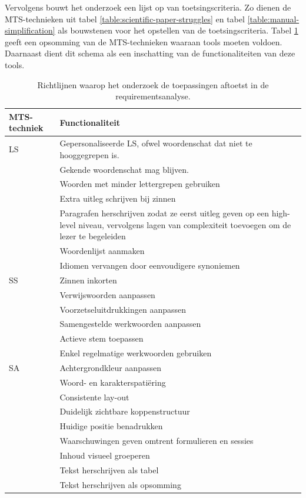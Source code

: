 Vervolgens bouwt het onderzoek een lijst op van toetsingscriteria. Zo dienen de MTS-technieken uit tabel \ref{table:scientific-paper-struggles} en tabel \ref{table:manual-simplification} als bouwstenen voor het opstellen van de toetsingscriteria. Tabel \ref{table:criteria-requirementsanalysis} geeft een opsomming van de MTS-technieken waaraan tools moeten voldoen. Daarnaast dient dit schema als een inschatting van de functionaliteiten van deze tools.

\begin{center}
	\begin{table}[H]
		\begin{tabular}{ | m{4cm} | m{11cm} | } 
			\hline
			\textbf{MTS-techniek} & \textbf{Functionaliteit} \\
			\hline
			LS & Gepersonaliseerde LS, ofwel woordenschat dat niet te hooggegrepen is. \\
            & Gekende woordenschat mag blijven. \\
			& Woorden met minder lettergrepen gebruiken \\
			& Extra uitleg schrijven bij zinnen \\
			& Paragrafen herschrijven zodat ze eerst uitleg geven op een high-level niveau, vervolgens lagen van complexiteit toevoegen om de lezer te begeleiden \\
			& Woordenlijst aanmaken \\
			& Idiomen vervangen door eenvoudigere synoniemen \\
			\hline
			SS & Zinnen inkorten \\
			& Verwijswoorden aanpassen \\
			& Voorzetseluitdrukkingen aanpassen \\
			& Samengestelde werkwoorden aanpassen \\
			& Actieve stem toepassen \\
			& Enkel regelmatige werkwoorden gebruiken \\
			\hline
			SA & Achtergrondkleur aanpassen \\
			& Woord- en karakterspatiëring \\
			& Consistente lay-out \\
			& Duidelijk zichtbare koppenstructuur \\
			& Huidige positie benadrukken \\
			& Waarschuwingen geven omtrent formulieren en sessies \\
			& Inhoud visueel groeperen \\
			& Tekst herschrijven als tabel \\
			& Tekst herschrijven als opsomming \\
			\hline
		\end{tabular}
		\caption{Richtlijnen waarop het onderzoek de toepassingen aftoetst in de requirementsanalyse.}
		\label{table:criteria-requirementsanalysis}	
	\end{table}
\end{center}

